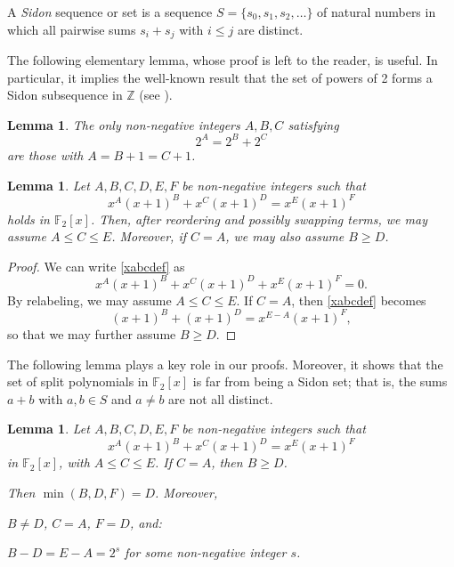 \documentclass[12pt, reqno]{article}
\theoremstyle{plain}
\newtheorem{lemma}[theorem]{Lemma}
\theoremstyle{definition}
\theoremstyle{remark}
\def\Z{\mathbb{Z}}
\def\F{\mathbb{F}}
\begin{document}
A \emph{Sidon} sequence or set is a sequence \( S = \{s_0, s_1, s_2, \ldots\} \) of natural numbers in which all pairwise sums \( s_i + s_j \) with \( i \leq j \) are distinct.

The following elementary lemma, whose proof is left to the reader, is useful. In particular, it implies the well-known result that the set of powers of 2 forms a Sidon subsequence in \( \Z \) (see \cite[Section C9]{Guy}).

\begin{lemma}
\label{powers2}
The only non-negative integers \( A, B, C \) satisfying
\begin{equation}
\label{xxabc}
2^A = 2^B + 2^C
\end{equation}
are those with \( A = B + 1 = C + 1 \).
\end{lemma}

\begin{lemma}
\label{reduction}
Let \( A, B, C, D, E, F \) be non-negative integers such that
\begin{equation}
\label{xabcdef}
x^A(x+1)^B + x^C(x+1)^D = x^E(x+1)^F
\end{equation}
holds in \( \F_2[x] \). Then, after reordering and possibly swapping terms, we may assume \( A \leq C \leq E \). Moreover, if \( C = A \), we may also assume \( B \geq D \).
\end{lemma}

\begin{proof}
We can write \eqref{xabcdef} as
\begin{equation}
\label{letters}
x^A(x+1)^B + x^C(x+1)^D + x^E(x+1)^F = 0.
\end{equation}
By relabeling, we may assume \( A \leq C \leq E \). If \( C = A \), then
\eqref{xabcdef} becomes
\begin{equation}
\label{letters1}
(x+1)^B + (x+1)^D = x^{E-A}(x+1)^F,
\end{equation}
so that we may further assume \( B \geq D \).
\end{proof}

The following lemma plays a key role in our proofs. Moreover, it shows that the set of split polynomials in \( \F_2[x] \) is far from being a Sidon set; that is, the sums \( a + b \) with \( a, b \in S \) and \( a \neq b \) are not all distinct.

\begin{lemma}
\label{ACEsept}
Let \( A, B, C, D, E, F \) be non-negative integers such that
\begin{equation}
\label{xabcdef1}
x^A(x+1)^B + x^C(x+1)^D = x^E(x+1)^F
\end{equation}
in \( \F_2[x] \), with \( A \leq C \leq E \). If \( C = A \), then \( B \geq D \).

Then \( \min(B, D, F) = D \). Moreover,
   
     \( B \neq D \), \( C = A \), \( F = D \), and:
    
         \( B - D = E - A = 2^s \) for some non-negative integer \( s \).
       
\end{lemma}
\end{document}
